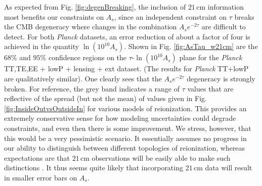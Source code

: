 \documentclass[twocolumn,aps,prd,nofootinbib,showpacs]{revtex4-1}
\begin{document}
As expected from Fig. \ref{fig:degenBreaking}, the inclusion of $21\,\textrm{cm}$ information most benefits our constraints on $A_s$, since an independent constraint on $\tau$ breaks the CMB degeneracy where changes in the combination $A_s e^{-2\tau}$ are difficult to detect. For both \emph{Planck} datasets, an error reduction of about a factor of four is achieved in the quantity $\ln (10^{10} A_s)$. Shown in Fig. \ref{fig:AsTau_w21cm} are the $68\%$ and $95\%$ confidence regions on the $\tau$-$\ln (10^{10} A_s)$ plane for the \emph{Planck} TT,TE,EE + lowP + lensing + ext dataset. (The results for \emph{Planck} TT+lowP are qualitatively similar). One clearly sees that the $A_s e^{-2\tau}$ degeneracy is strongly broken. For reference, the grey band indicates a range of $\tau$ values that are reflective of the spread (but not the mean) of values given in Fig. \ref{fig:InsideOutvsOutsideIn} for various models of reionization. This provides an extremely conservative sense for how modeling uncertainties could degrade constraints, and even then there is some improvement. We stress, however, that this would be a very pessimistic scenario. It essentially assumes no progress in our ability to distinguish between different topologies of reionization, whereas expectations are that $21\,\textrm{cm}$ observations will be easily able to make such distinctions \cite{choudhury_et_al2009,watkinson_and_pritchard2014}. It thus seems quite likely that incorporating $21\,\textrm{cm}$ data will result in smaller error bars on $A_s$.
\end{document}
